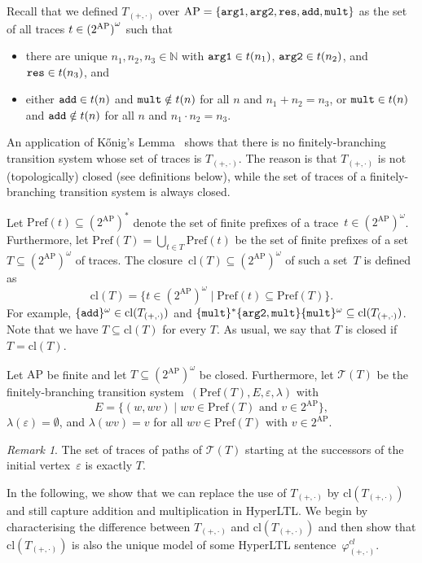 \documentclass[dvipsnames,10pt,a4paper]{amsart}
\theoremstyle{definition}
\theoremstyle{remark}
\newtheorem{rem}[thm]{Remark}
\newcommand{\set}[1]{\{#1\}}
\newcommand{\nats}{\mathbb{N}}
\renewcommand{\epsilon}{\varepsilon}
\newcommand{\pow}[1]{2^{#1}}
\newcommand{\tsys}{\mathcal{T}}
\newcommand{\hyltl}{{HyperLTL}\xspace}
\newcommand{\ap}[0]{\mathrm{AP}}
\newcommand\AP{\textup{AP}}
\newcommand\argl{\textup{\texttt{arg1}}}
\newcommand\argr{\textup{\texttt{arg2}}}
\newcommand\res{\textup{\texttt{res}}}
\newcommand\add{\textup{\texttt{add}}}
\newcommand\mult{\textup{\texttt{mult}}}
\newcommand\phiop{\varphi_{({+},{\cdot})}}
\newcommand\Top{T_{({+},{\cdot})}}
\newcommand{\prefs}[1]{\mathrm{Pref}(#1)}
\newcommand{\closure}[1]{\mathrm{cl}(#1)}
\newcommand{\phiopc}{\phiop^{cl}}
\begin{document}
Recall that we defined $\Top$ over $\AP = \{\argl,\argr,\res,\add,\mult\}$ as the set of all traces $t \in {(2^{\AP})}^\omega$ such that 
  \begin{itemize}
  \item there are unique $n_1,n_2,n_3 \in \nats$ with $\argl \in t(n_1)$,
    $\argr \in t(n_2)$, and $\res \in t(n_3)$, and
  \item either $\add \in t(n)$ and $\mult \notin t(n)$  for all $n$ and $n_1+n_2 = n_3$,
    or $\mult \in t(n)$ and $\add \notin t(n)$  for all $n$ and $n_1 \cdot n_2 = n_3$.
  \end{itemize}

An application of Kőnig's Lemma~\cite{konig} shows that there is no finitely-branching transition system whose set of traces is $\Top$. 
The reason is that $\Top$ is not (topologically) closed (see definitions below), while the set of traces of a finitely-branching transition system is always closed.


Let $\prefs{t} \subseteq (\pow{\ap})^*$ denote the set of finite prefixes of a trace~$t \in (\pow{\ap})^\omega$.
Furthermore, let $\prefs{T} = \bigcup_{t \in T}\prefs{t}$ be the set of finite prefixes of a set~$T \subseteq (\pow{\ap})^\omega$ of traces.
The closure~$\closure{T} \subseteq (\pow{\ap})^\omega$ of such a set~$T$ is defined as 
\[
\closure{T} = \set{t \in (\pow{\ap})^\omega \mid \prefs{t} \subseteq \prefs{T}}.
\]
For example, $\set{\add}^\omega \in \closure{\Top}$ and $\set{\mult}^*\set{\argr,\mult}\set{\mult}^\omega \subseteq \closure{\Top}$.
Note that we have $T \subseteq \closure{T}$ for every $T$. 
As usual, we say that $T$ is closed if $T = \closure{T}$.

Let $\ap$ be finite and let $T \subseteq (\pow{\ap})^\omega$ be closed.
Furthermore, let $\tsys(T)$ be the finitely-branching transition system~$(\prefs{T}, E, \epsilon, \lambda)$ with \[E = \set{(w,wv) \mid wv \in \prefs{T} \text{ and } v \in \pow{\ap} },\]
$\lambda(\epsilon) = \emptyset$, and $\lambda(wv) = v$ for all $wv \in \prefs{T}$ with $v \in \pow{\ap}$.


\begin{rem}
The set of traces of paths of $\tsys(T)$ starting at the successors of the initial vertex~$\epsilon$ is exactly $T$.
\end{rem}


In the following, we show that we can replace the use of $\Top$ by $\closure{\Top}$ and still capture addition and multiplication in \hyltl.
We begin by characterising the difference between $\Top$ and $\closure{\Top}$ and then show that $\closure{\Top}$ is also the unique model of some \hyltl sentence~$\phiopc$.
\end{document}
